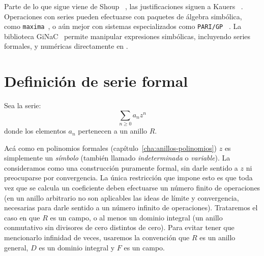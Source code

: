   Parte de lo que sigue viene de Shoup~%
    \cite{shoup09:_comput_introd_number_theor_algeb},
  las justificaciones siguen a Kauers~%
    \cite{kauers11:_concr_tetrah}.
  Operaciones con series pueden efectuarse con paquetes de álgebra simbólica,%
  como \texttt{maxima}~\cite{maxima14b:_computer_algebra},%
  o aún mejor con sistemas especializados como \texttt{PARI/GP}~%
    \cite{PARI:2.7.2}.%
  La biblioteca GiNaC~%
    \cite{bauer02:_ginac_fram_symbol_comput, GiNaC:1.6.2}%
  permite manipular expresiones simbólicas,
  incluyendo series formales,
  y numéricas
  directamente en \cplusplus.%

\section{Definición de serie formal}
\label{sec:serie-formal-def}

  Sea la serie:
  \begin{equation*}
    \sum_{n \ge 0} a_n z^n
  \end{equation*}
  donde los elementos \(a_n\) pertenecen a un anillo \(R\).%

  Acá como en polinomios formales
  (capítulo~\ref{cha:anillos-polinomios})
  \(z\) es simplemente un \emph{símbolo}
  (también llamado \emph{indeterminada} o \emph{variable}).
  La consideramos como una construcción puramente formal,
  sin darle sentido a \(z\)
  ni preocuparse por convergencia.%
  La única restricción que impone esto
  es que toda vez que se calcula un coeficiente
  deben efectuarse un número finito de operaciones
  (en un anillo arbitrario no son aplicables
   las ideas de límite y convergencia,
   necesarias para darle sentido a un número infinito de operaciones).
  Trataremos el caso en que \(R\) es un campo,%
  o al menos un dominio integral%
  (un anillo conmutativo sin divisores de cero distintos de cero).
  Para evitar tener que mencionarlo infinidad de veces,
  usaremos la convención que \(R\) es un anillo general,
  \(D\) es un dominio integral
  y \(F\) es un campo.

